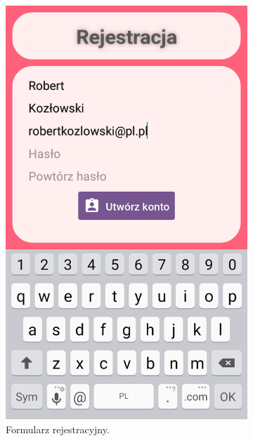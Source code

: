 \documentclass[licencjacka]{pracamgr}
\begin{document}
\begin{figure}[H]
\begin{subfigure}[b]{0.4\linewidth}
\begin{framed}
      \includegraphics[width=\linewidth]{rejestracja2.png}
    \end{framed}
    \caption{Formularz rejestracyjny.}
  \end{subfigure}
  \begin{subfigure}[b]{0.4\linewidth}
    \begin{framed}

\end{framed}
\end{subfigure}
\end{figure}
\end{document}
